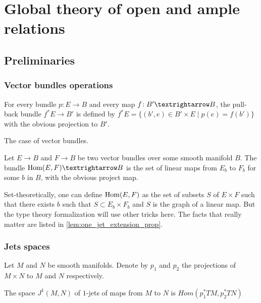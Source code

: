 \chapter{Global theory of open and ample relations}
\label{chap:global}

\section{Preliminaries}

\subsection{Vector bundles operations}
\label{sec:vector_bundles_operations}

\begin{definition}
\label{def:pull_back_bundle}
For every bundle $p : E → B$ and every map $f \co B' → B$,
the pull-back bundle $f^*E → B'$ is defined by
$f^*E = \{(b', e) ∈ B' × E \;|\; p(e) = f(b')\}$ with
the obvious projection to $B'$.
\end{definition}

The case of vector bundles.

\begin{definition}
\label{def:hom_bundle}
Let $E → B$ and $F → B$ be two vector bundles over some smooth manifold
$B$. The bundle $\Hom(E, F) → B$ is the set of linear maps from
$E_b$ to $F_b$ for some $b$ in $B$, with the obvious project map.
\end{definition}

Set-theoretically, one can define $\operatorname{Hom}(E, F)$ as the set of subsets
$S$ of $E × F$ such that there exists $b$ such that $S ⊂ E_b × F_b$
and $S$ is the graph of a linear map. But the type theory formalization
will use other tricks here. The facts that really matter are listed in
\cref{lem:one_jet_extension_prop}.


\subsection{Jets spaces}

\begin{definition}
\label{def:one_jet_space}
Let $M$ and $N$ be smooth manifolds. Denote by
$p_1$ and $p_2$ the projections of $M × N$ to
$M$ and $N$ respectively.

The space $J^1(M, N)$ of $1$-jets of maps from $M$ to $N$ is
$Hom(p_1^*TM, p_2^*TN)$
\end{definition}

